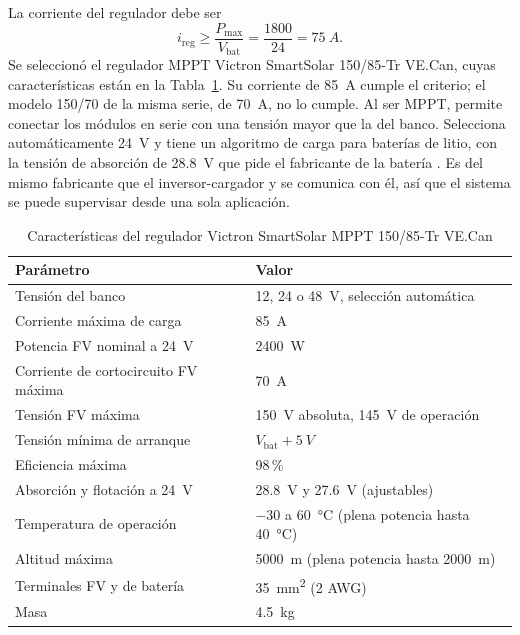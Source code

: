 La corriente del regulador debe ser
\begin{equation}
i_{\mathrm{reg}} \geq \frac{P_{\max}}{V_{\mathrm{bat}}} = \frac{1800}{24} = \SI{75}{A}.
\end{equation}
Se seleccionó el regulador MPPT Victron SmartSolar 150/85-Tr VE.Can, cuyas características están en la Tabla~\ref{tab:regulador}. Su corriente de \SI{85}{A} cumple el criterio; el modelo 150/70 de la misma serie, de \SI{70}{A}, no lo cumple. Al ser MPPT, permite conectar los módulos en serie con una tensión mayor que la del banco. Selecciona automáticamente \SI{24}{V} y tiene un algoritmo de carga para baterías de litio, con la tensión de absorción de \SI{28.8}{V} que pide el fabricante de la batería \cite{victron_mppt, pq_manual}. Es del mismo fabricante que el inversor-cargador y se comunica con él, así que el sistema se puede supervisar desde una sola aplicación.

\begin{table}[!htb]
\caption{Características del regulador Victron SmartSolar MPPT 150/85-Tr VE.Can \cite{victron_mppt}}
\label{tab:regulador}
\centering
\footnotesize
\begin{tabular}{l l}
\toprule
Parámetro & Valor \\
\midrule
Tensión del banco & 12, 24 o \SI{48}{V}, selección automática \\
Corriente máxima de carga & \SI{85}{A} \\
Potencia FV nominal a \SI{24}{V} & \SI{2400}{W} \\
Corriente de cortocircuito FV máxima & \SI{70}{A} \\
Tensión FV máxima & \SI{150}{V} absoluta, \SI{145}{V} de operación \\
Tensión mínima de arranque & $V_{\mathrm{bat}}+\SI{5}{V}$ \\
Eficiencia máxima & 98\,\% \\
Absorción y flotación a \SI{24}{V} & \SI{28.8}{V} y \SI{27.6}{V} (ajustables) \\
Temperatura de operación & $-30$ a \SI{60}{\celsius} (plena potencia hasta \SI{40}{\celsius}) \\
Altitud máxima & \SI{5000}{m} (plena potencia hasta \SI{2000}{m}) \\
Terminales FV y de batería & \SI{35}{mm^2} (2 AWG) \\
Masa & \SI{4.5}{kg} \\
\bottomrule
\end{tabular}
\end{table}

